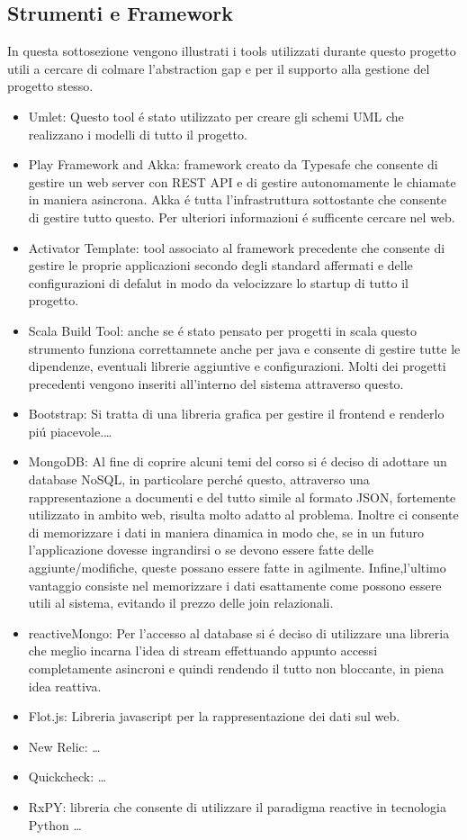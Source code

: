 \subsection{Strumenti e Framework}

In questa sottosezione vengono illustrati i tools utilizzati durante questo progetto utili a cercare di colmare l'abstraction gap e per il supporto alla gestione del progetto stesso.

\begin{itemize}
 \item {Umlet:} Questo tool \'e stato utilizzato per creare gli schemi UML che realizzano i modelli di tutto il progetto.\cite{Umlet}
 \item {Play Framework and Akka:} framework creato da Typesafe che consente di gestire un web server con REST API e di gestire autonomamente le chiamate in maniera asincrona. Akka \'e tutta l'infrastruttura sottostante che consente di gestire tutto questo. Per ulteriori informazioni \'e sufficente cercare nel web.\cite{Akka,PlayFramework}
 \item {Activator Template:} tool associato al framework precedente che consente di gestire le proprie applicazioni secondo degli standard affermati e delle configurazioni di defalut in modo da velocizzare lo startup di tutto il progetto.\cite{Activator&SBT}
 \item {Scala Build Tool:} anche se \'e stato pensato per progetti in scala questo strumento funziona correttamnete anche per java e consente di gestire tutte le dipendenze, eventuali librerie aggiuntive e configurazioni. Molti dei progetti precedenti vengono inseriti all'interno del sistema attraverso questo.\cite{Activator&SBT}
\item {Bootstrap:} Si tratta di una libreria grafica per gestire il frontend e renderlo pi\'u piacevole.\ldots
 \item {MongoDB:} Al fine di coprire alcuni temi del corso si \'e deciso di adottare un database NoSQL, in particolare perch\'e questo, attraverso una rappresentazione a documenti e del tutto simile al formato JSON, fortemente utilizzato in ambito web, risulta molto adatto al problema. Inoltre ci consente di memorizzare i dati in maniera dinamica in modo che, se in un futuro l'applicazione dovesse ingrandirsi o se devono essere fatte delle aggiunte/modifiche, queste possano essere fatte in agilmente. Infine,l'ultimo vantaggio consiste nel memorizzare i dati esattamente come possono essere utili al sistema, evitando il prezzo delle join relazionali. \cite{MongoDB}
 \item {reactiveMongo:} Per l'accesso al database si \'e deciso di utilizzare una libreria che meglio incarna l'idea di stream effettuando appunto accessi completamente asincroni e quindi rendendo il tutto non bloccante, in piena idea reattiva.\cite{ReactiveMongo}
 \item {Flot.js:} Libreria javascript per la rappresentazione dei dati sul web. \cite{FlotJS}
 \item {New Relic:} \ldots
 \item {Quickcheck:} \ldots
 \item {RxPY:} libreria che consente di utilizzare il paradigma reactive in tecnologia Python \ldots \cite{RxPy}
\end{itemize}
